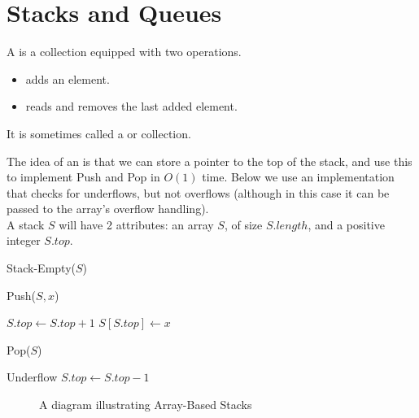 \documentclass[11pt]{report}
\begin{document}
\section{Stacks and Queues}
\begin{defi}[Stack]
    A  is a collection equipped with two operations.
    \begin{itemize}
        \item {} adds an element.
        \item {} reads and removes the last added element.
    \end{itemize}
    It is sometimes called a  or  collection. 
\end{defi}
\begin{impl} The idea of an  is that we can store a pointer to the top of the stack, and use this to implement Push and Pop in $O(1)$ time. Below we use an implementation that checks for underflows, but not overflows (although in this case it can be passed to the array's overflow handling).
    \\ A stack $S$ will have 2 attributes: an array $S$, of size $S.length$, and a positive integer $S.top$.
    \mypar
    \begin{algorithm}[H]
        \caption{Stack-Empty($S$)}
    \end{algorithm}
    \begin{algorithm}[H]
        \caption{Push($S, x$)}
        $S.top \gets S.top + 1$\;
        $S[S.top] \gets x$\;
    \end{algorithm}
    \begin{algorithm}[H]
        \caption{Pop($S$)}
        {
            \Error Underflow\;
        }
        \Else
        {
            $S.top \gets S.top - 1$\;
            \;
        }
    \end{algorithm}
    \begin{figure}[H]
        \caption{A diagram illustrating Array-Based Stacks}
        \centering
\end{figure}
\end{impl}
\end{document}
